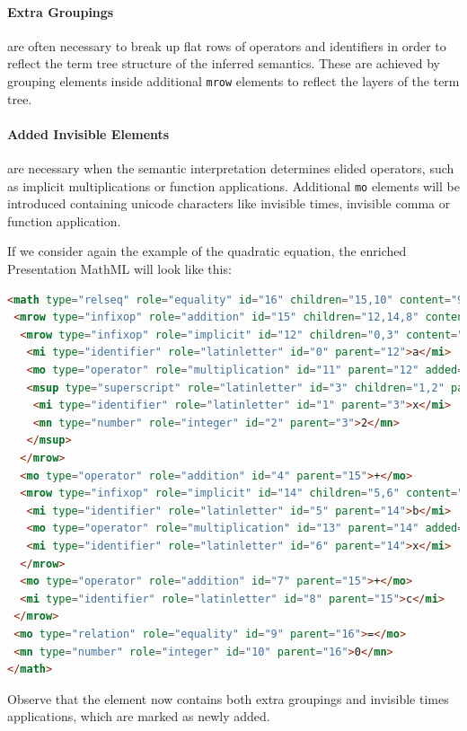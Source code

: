 \documentclass{llncs}
\begin{document}
\paragraph{Extra Groupings} are often necessary to break up flat rows of
operators and identifiers in order to reflect the term tree structure of the
inferred semantics. These are achieved by grouping elements inside additional
\texttt{mrow} elements to reflect the layers of the term tree.


\paragraph{Added Invisible Elements} are necessary when the semantic
interpretation determines elided operators, such as implicit multiplications or
function applications. Additional \texttt{mo} elements will be introduced containing
unicode characters like invisible times, invisible comma or function
application.

If we consider again the example of the quadratic equation, the enriched
Presentation MathML will look like this:

{\scriptsize\begin{lstlisting}[language=html]
<math type="relseq" role="equality" id="16" children="15,10" content="9">
 <mrow type="infixop" role="addition" id="15" children="12,14,8" content="4,7" parent="16">
  <mrow type="infixop" role="implicit" id="12" children="0,3" content="11" parent="15">
   <mi type="identifier" role="latinletter" id="0" parent="12">a</mi>
   <mo type="operator" role="multiplication" id="11" parent="12" added="true">&#x2062;</mo>
   <msup type="superscript" role="latinletter" id="3" children="1,2" parent="12">
    <mi type="identifier" role="latinletter" id="1" parent="3">x</mi>
    <mn type="number" role="integer" id="2" parent="3">2</mn>
   </msup>
  </mrow>
  <mo type="operator" role="addition" id="4" parent="15">+</mo>
  <mrow type="infixop" role="implicit" id="14" children="5,6" content="13" parent="15">
   <mi type="identifier" role="latinletter" id="5" parent="14">b</mi>
   <mo type="operator" role="multiplication" id="13" parent="14" added="true">&#x2062;</mo>
   <mi type="identifier" role="latinletter" id="6" parent="14">x</mi>
  </mrow>
  <mo type="operator" role="addition" id="7" parent="15">+</mo>
  <mi type="identifier" role="latinletter" id="8" parent="15">c</mi>
 </mrow>
 <mo type="relation" role="equality" id="9" parent="16">=</mo>
 <mn type="number" role="integer" id="10" parent="16">0</mn>
</math>
\end{lstlisting}}
\noindent Observe that the element now contains both extra groupings and
invisible times applications, which are marked as newly added.
\end{document}
